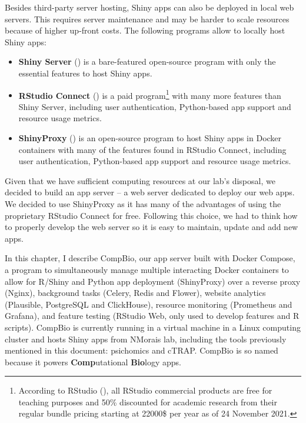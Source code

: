 Besides third-party server hosting, Shiny apps can also be deployed in local web servers. This requires server maintenance and may be harder to scale resources because of higher up-front costs. The following programs allow to locally host Shiny apps:

\begin{itemize}
	\item \textbf{Shiny Server} () is a bare-featured open-source program with only the essential features to host Shiny apps.
	\item \textbf{RStudio Connect} () is a paid program\footnote{According to RStudio (), all RStudio commercial products are free for teaching purposes and 50\% discounted for academic research from their regular bundle pricing starting at 22000\$ per year as of 24 November 2021.} with many more features than Shiny Server, including user authentication, Python-based app support and resource usage metrics.
	\item \textbf{ShinyProxy} () is an open-source program to host Shiny apps in Docker containers with many of the features found in RStudio Connect, including user authentication, Python-based app support and resource usage metrics.
\end{itemize}

Given that we have sufficient computing resources at our lab's disposal, we decided to build an app server -- a web server dedicated to deploy our web apps. We decided to use ShinyProxy as it has many of the advantages of using the proprietary RStudio Connect for free. Following this choice, we had to think how to properly develop the web server so it is easy to maintain, update and add new apps.


In this chapter, I describe CompBio, our app server built with Docker Compose, a program to simultaneously manage multiple interacting Docker containers to allow for R/Shiny and Python app deployment (ShinyProxy) over a reverse proxy (Nginx), background tasks (Celery, Redis and Flower), website analytics (Plausible, PostgreSQL and ClickHouse), resource monitoring (Prometheus and Grafana), and feature testing (RStudio Web, only used to develop features and R scripts). CompBio is currently running in a virtual machine in a Linux computing cluster and hosts Shiny apps from NMorais lab, including the tools previously mentioned in this document: psichomics and cTRAP. CompBio is so named because it powers \textbf{Comp}utational \textbf{Bio}logy apps.

